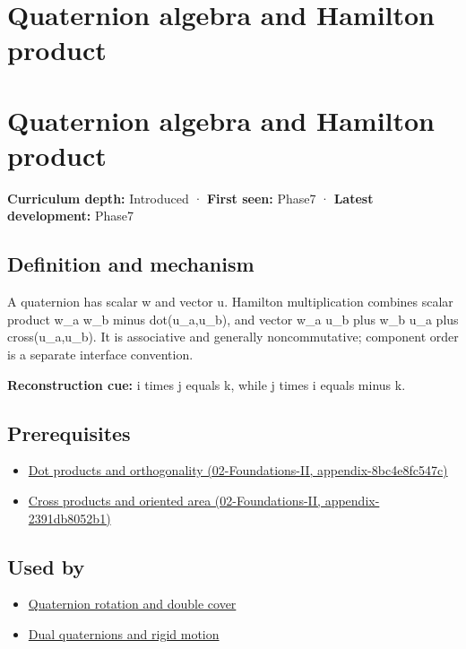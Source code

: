 \hypertarget{appendix-965d9260eeab}{}
\section*{Quaternion algebra and Hamilton product}
\section{Quaternion algebra and Hamilton product}\label{quaternion-algebra-and-hamilton-product}

\textbf{Curriculum depth:} Introduced · \textbf{First seen:} Phase7 · \textbf{Latest development:} Phase7

\subsection{Definition and mechanism}\label{definition-and-mechanism}

A quaternion has scalar w and vector u. Hamilton multiplication combines scalar product w\_a w\_b minus dot(u\_a,u\_b), and vector w\_a u\_b plus w\_b u\_a plus cross(u\_a,u\_b). It is associative and generally noncommutative; component order is a separate interface convention.

\textbf{Reconstruction cue:} i times j equals k, while j times i equals minus k.

\subsection{Prerequisites}\label{prerequisites}

\begin{itemize}
\tightlist
\item
  \href{}{Dot products and orthogonality (02-Foundations-II, appendix-8bc4e8fc547c)}
\item
  \href{}{Cross products and oriented area (02-Foundations-II, appendix-2391db8052b1)}
\end{itemize}

\subsection{Used by}\label{used-by}

\begin{itemize}
\tightlist
\item
  \hyperref[appendix-8e61ab68f6b2]{Quaternion rotation and double cover}
\item
  \hyperref[appendix-d1ea57347893]{Dual quaternions and rigid motion}
\end{itemize}

